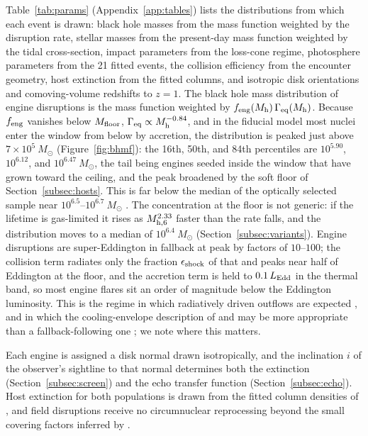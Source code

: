 \documentclass[twocolumn,pdftex]{aastex701}
\newcommand{\msun}{M_{\odot}\xspace}
\newcommand{\mhsix}{M_{\rm h,6}\xspace}
\newcommand{\gameq}{\Gamma_{\rm eq}\xspace}
\begin{document}
Table~\ref{tab:params} (Appendix~\ref{app:tables}) lists the distributions from which each event is drawn: black hole masses from the mass function weighted by the disruption rate, stellar masses from the present-day mass function weighted by the tidal cross-section, impact parameters from the loss-cone regime, photosphere parameters from the 21 fitted events, the collision efficiency from the encounter geometry, host extinction from the fitted columns, and isotropic disk orientations and comoving-volume redshifts to $z = 1$. The black hole mass distribution of engine disruptions is the mass function weighted by $f_{\rm eng}(M_{\rm h})\, \gameq(M_{\rm h})$. Because $f_{\rm eng}$ vanishes below $M_{\rm floor}$, $\gameq \propto M_{\rm h}^{-0.84}$, and in the fiducial model most nuclei enter the window from below by accretion, the distribution is peaked just above $7 \times 10^{5}~\msun$ (Figure~\ref{fig:bhmf}): the 16th, 50th, and 84th percentiles are $10^{5.90}$, $10^{6.12}$, and $10^{6.47}~\msun$, the tail being engines seeded inside the window that have grown toward the ceiling, and the peak broadened by the soft floor of Section~\ref{subsec:hosts}. This is far below the median of the optically selected sample near $10^{6.5}$--$10^{6.7}~\msun$ \citep{Mockler:2019a,Yao:2023a,Nicholl:2022a}. The concentration at the floor is not generic: if the lifetime is gas-limited it rises as $\mhsix^{2.33}$ faster than the rate falls, and the distribution moves to a median of $10^{6.4}~\msun$ (Section~\ref{subsec:variants}). Engine disruptions are super-Eddington in fallback at peak by factors of $10$--$100$; the collision term radiates only the fraction $\epsilon_{\rm shock}$ of that and peaks near half of Eddington at the floor, and the accretion term is held to $0.1\, L_{\rm Edd}$ in the thermal band, so most engine flares sit an order of magnitude below the Eddington luminosity. This is the regime in which radiatively driven outflows are expected \citep{Metzger:2016a,Dai:2018a}, and in which the cooling-envelope description of \citet{Metzger:2022a} and \citet{Sarin:2024a} may be more appropriate than a fallback-following one \citep{Mummery:2025b}; we note where this matters.

Each engine is assigned a disk normal drawn isotropically, and the inclination $i$ of the observer's sightline to that normal determines both the extinction (Section~\ref{subsec:screen}) and the echo transfer function (Section~\ref{subsec:echo}). Host extinction for both populations is drawn from the fitted column densities of \citet{Nicholl:2022a}, and field disruptions receive no circumnuclear reprocessing beyond the small covering factors inferred by \citet{Jiang:2021b}.
\end{document}
